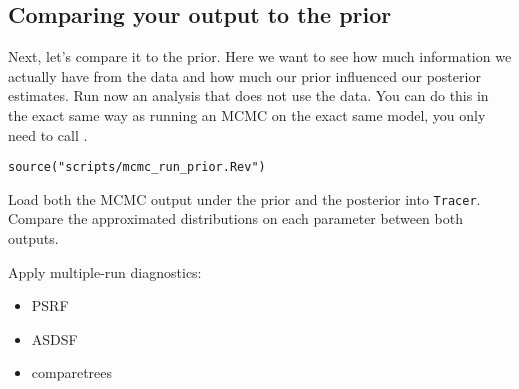 %

\subsection{Comparing your output to the prior}
Next, let's compare it to the prior.
Here we want to see how much information we actually have from the data and how much our prior influenced our posterior estimates.
Run now an analysis that does not use the data.
You can do this in \RevBayes the exact same way as running an MCMC on the exact same model, you only need to call .
{\tt \begin{snugshade*}
\begin{lstlisting}
source("scripts/mcmc_run_prior.Rev")
\end{lstlisting}
\end{snugshade*}}
Load both the MCMC output under the prior and the posterior into \verb!Tracer!.
Compare the approximated distributions on each parameter between both outputs.



Apply multiple-run diagnostics:
\begin{itemize}
\item{PSRF}
\item{ASDSF}
\item{comparetrees}
\end{itemize}

